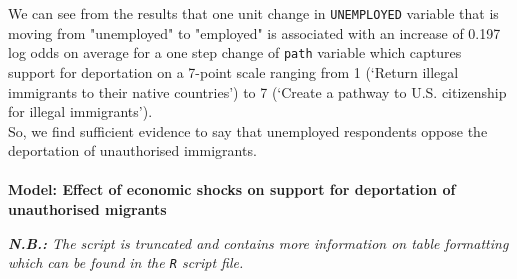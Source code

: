 \documentclass[12pt,letterpaper]{article}
\begin{document}
We can see from the results that one unit change in \texttt{UNEMPLOYED} variable that is moving from "unemployed" to "employed" is associated with an increase of 0.197 log odds on average for a one step change of \texttt{path} variable which captures support for deportation on a 7-point scale ranging from 1 (‘Return illegal immigrants to their native countries’) to 7 (‘Create a pathway to U.S. citizenship for illegal immigrants’).\\
So, we find sufficient evidence to say that unemployed respondents oppose the deportation of unauthorised immigrants.\\
\\
\textbf{Model: Effect of economic shocks on support for deportation of unauthorised migrants}

\textit{\textbf{N.B.:} The script is truncated and contains more information on table formatting which can be found in the \texttt{R} script file.}
\end{document}
